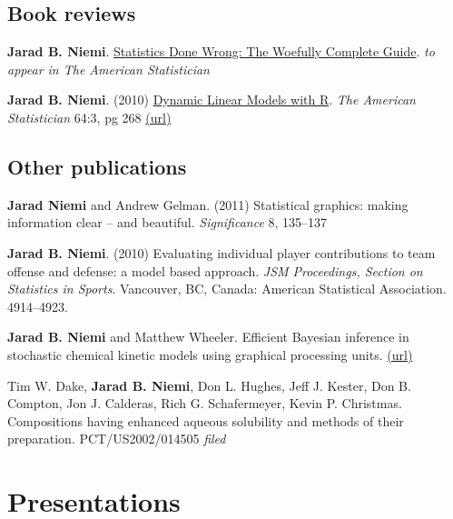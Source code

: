 \documentclass[overlapped,line]{res}
\begin{document}
\begin{resume}
\subsection{\bf Book reviews}

{\bf Jarad B. Niemi}. \underline{Statistics Done Wrong: The Woefully Complete Guide}. \emph{to appear in The American Statistician} 

{\bf Jarad B. Niemi}. (2010) \underline{Dynamic Linear Models with R}. \emph{The American Statistician} 64:3, pg 268 \href{http://dx.doi.org/10.1198/tast.2010.br643}{(url)}




\subsection{\bf Other publications}

{\bf Jarad Niemi } and Andrew Gelman. (2011) Statistical graphics: making information clear -- and beautiful. \emph{Significance} 8, 135--137

{\bf Jarad B. Niemi}. (2010) Evaluating individual player contributions to team offense and defense: a model based approach. \emph{JSM Proceedings, Section on Statistics in Sports}. Vancouver, BC, Canada: American Statistical Association. 4914--4923.

{\bf Jarad B. Niemi} and Matthew Wheeler. Efficient Bayesian inference in stochastic chemical kinetic models using graphical processing units. \href{http://arxiv.org/abs/1101.4242}{(url)}

Tim W. Dake, {\bf Jarad B. Niemi}, Don L. Hughes, Jeff J. Kester, Don B. Compton, Jon J. Calderas, Rich G. Schafermeyer, Kevin P. Christmas. Compositions having enhanced aqueous solubility and methods of their preparation. PCT/US2002/014505 \emph{filed}



\section{\bf Presentations}

%


\end{resume}
\end{document}
